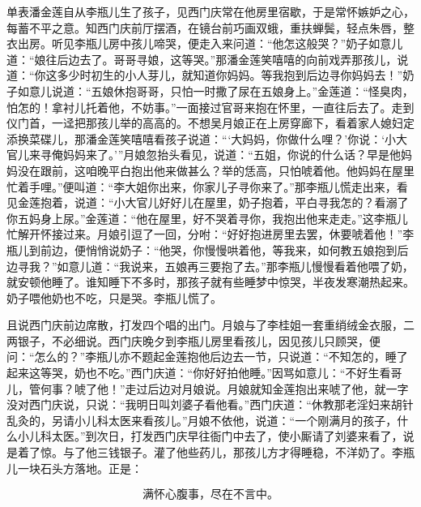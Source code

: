 单表潘金莲自从李瓶儿生了孩子，见西门庆常在他房里宿歇，于是常怀嫉妒之心，每蓄不平之意。知西门庆前厅摆酒，在镜台前巧画双蛾，重扶蝉鬓，轻点朱唇，整衣出房。听见李瓶儿房中孩儿啼哭，便走入来问道：“他怎这般哭？”奶子如意儿道：“娘往后边去了。哥哥寻娘，这等哭。”那潘金莲笑嘻嘻的向前戏弄那孩儿，说道：“你这多少时初生的小人芽儿，就知道你妈妈。等我抱到后边寻你妈妈去！”奶子如意儿说道：“五娘休抱哥哥，只怕一时撒了尿在五娘身上。”金莲道：“怪臭肉，怕怎的！拿衬儿托着他，不妨事。”一面接过官哥来抱在怀里，一直往后去了。走到仪门首，一迳把那孩儿举的高高的。不想吴月娘正在上房穿廊下，看着家人媳妇定添换菜碟儿，那潘金莲笑嘻嘻看孩子说道：“‘大妈妈，你做什么哩？’你说：‘小大官儿来寻俺妈妈来了。’”月娘忽抬头看见，说道：“五姐，你说的什么话？早是他妈妈没在跟前，这咱晚平白抱出他来做甚么？举的恁高，只怕唬着他。他妈妈在屋里忙着手哩。”便叫道：“李大姐你出来，你家儿子寻你来了。”那李瓶儿慌走出来，看见金莲抱着，说道：“小大官儿好好儿在屋里，奶子抱着，平白寻我怎的？看溺了你五妈身上尿。”金莲道：“他在屋里，好不哭着寻你，我抱出他来走走。”这李瓶儿忙解开怀接过来。月娘引逗了一回，分咐：“好好抱进房里去罢，休要唬着他！”李瓶儿到前边，便悄悄说奶子：“他哭，你慢慢哄着他，等我来，如何教五娘抱到后边寻我？”如意儿道：“我说来，五娘再三要抱了去。”那李瓶儿慢慢看着他喂了奶，就安顿他睡了。谁知睡下不多时，那孩子就有些睡梦中惊哭，半夜发寒潮热起来。奶子喂他奶也不吃，只是哭。李瓶儿慌了。

且说西门庆前边席散，打发四个唱的出门。月娘与了李桂姐一套重绡绒金衣服，二两银子，不必细说。西门庆晚夕到李瓶儿房里看孩儿，因见孩儿只顾哭，便问：“怎么的？”李瓶儿亦不题起金莲抱他后边去一节，只说道：“不知怎的，睡了起来这等哭，奶也不吃。”西门庆道：“你好好拍他睡。”因骂如意儿：“不好生看哥儿，管何事？唬了他！”走过后边对月娘说。月娘就知金莲抱出来唬了他，就一字没对西门庆说，只说：“我明日叫刘婆子看他看。”西门庆道：“休教那老淫妇来胡针乱灸的，另请小儿科太医来看孩儿。”月娘不依他，说道：“一个刚满月的孩子，什么小儿科太医。”到次日，打发西门庆早往衙门中去了，使小厮请了刘婆来看了，说是着了惊。与了他三钱银子。灌了他些药儿，那孩儿方才得睡稳，不洋奶了。李瓶儿一块石头方落地。正是：

\[
满怀心腹事，尽在不言中。
\]
